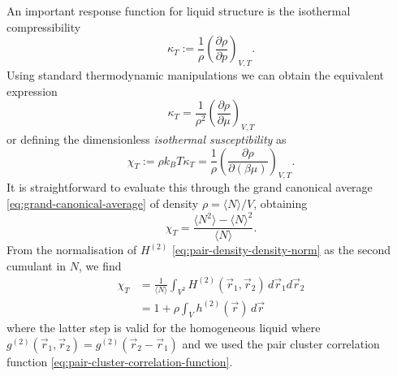 An important response function for liquid structure is the isothermal compressibility
\begin{equation*}\label{eq:isothermal-compressibility}
  \kappa_T
  :=
  \frac{1}{\rho}
  \left( \frac{\partial \rho}{\partial p} \right)_{V,T}.
\end{equation*}
Using standard thermodynamic manipulations we can obtain the equivalent expression
\begin{equation*}
  \kappa_T
  =
  \frac{1}{\rho^2}
  \left( \frac{\partial \rho}{\partial \mu} \right)_{V,T}
\end{equation*}
or defining the dimensionless \emph{isothermal susceptibility} as \begin{equation*}\label{eq:isothermal-susceptibility}
  \chi_T
  :=
  \rho k_B T \kappa_T
  =
  \frac{1}{\rho}
  \left( \frac{\partial \rho}{\partial (\beta \mu)} \right)_{V,T}.
\end{equation*}
It is straightforward to evaluate this through the grand canonical average \eqref{eq:grand-canonical-average} of density $\rho = \langle N \rangle / V$, obtaining
\begin{equation}
  \chi_T
  =
  \frac{ \langle N^2 \rangle - \langle N \rangle^2 }{\langle N \rangle}.
\end{equation}
From the normalisation of $H^{(2)}$ \eqref{eq:pair-density-density-norm} as the second cumulant in $N$, we find
\begin{equation}\label{eq:compressibility-h2}
  \begin{split}
    \chi_T
    &=
    \frac{1}{\langle N \rangle}
    \int_{V^2} H^{(2)}(\vec{r}_1, \vec{r}_2) \, d\vec{r}_1 d\vec{r}_2
    \\ &=
    1
    + \rho \int_V h^{(2)}(\vec{r}) \, d\vec{r}
  \end{split}
\end{equation}
where the latter step is valid for the homogeneous liquid where $g^{(2)}(\vec{r}_1, \vec{r}_2) = g^{(2)}(\vec{r}_2 - \vec{r}_1)$ and we used the pair cluster correlation function \eqref{eq:pair-cluster-correlation-function}.

